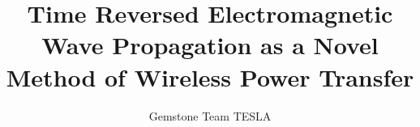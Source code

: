 %
%
%
%
%
%
%
%
%
%
%

\title{Time Reversed Electromagnetic Wave Propagation as a Novel Method of Wireless Power Transfer}

\author{Gemstone Team TESLA}




